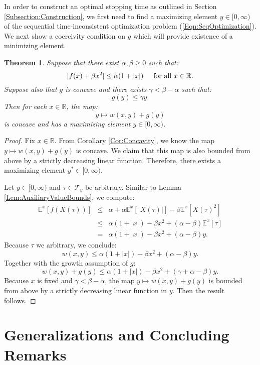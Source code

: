 \documentclass[11pt]{article}
\newtheorem{thm}{Theorem}
\begin{document}
In order to construct an optimal stopping time as outlined in Section \ref{Subsection:Construction}, we first need to find a maximizing element $y\in[0,\infty)$ of the sequential time-inconsistent optimization problem (\ref{Eqn:SeqOptimization}). We next show a coercivity condition on $g$ which will provide existence of a minimizing element.

\begin{thm}\label{Thm:MaximalElement}
Suppose that there exist $\alpha,\beta\geq 0$ such that:
\[|f(x)+\beta x^2|\leq\alpha(1+|x|)\hspace{0.5cm}\text{for all }x\in\mathbb{R}.\]
Suppose also that $g$ is concave and there exists $\gamma <\beta-\alpha$ such that:
\[g(y)\leq\gamma y.\]
Then for each $x\in\mathbb{R}$, the map:
\[y\mapsto w(x,y)+g(y)\]
is concave and has a maximizing element $y\in[0,\infty)$.\end{thm}
\begin{proof}
Fix $x\in\mathbb{R}$. From Corollary \ref{Cor:Concavity}, we know the map $y\mapsto w(x,y)+g(y)$ is concave. We claim that this map is also bounded from above by a strictly decreasing linear function. Therefore, there exists a maximizing element $y^*\in[0,\infty)$.

Let $y\in[0,\infty)$ and $\tau\in\mathcal{T}_y$ be arbitrary. Similar to Lemma \ref{Lem:AuxiliaryValueBounds}, we compute:
\begin{eqnarray}
\mathbb{E}^x\left[f(X(\tau))\right] & \leq & \alpha + \alpha\mathbb{E}^x\left[|X(\tau)|\right]-\beta\mathbb{E}^x\left[X(\tau)^2\right]\nonumber\\
& \leq & \alpha(1+|x|)-\beta x^2+(\alpha-\beta)\mathbb{E}^x\left[\tau\right]\nonumber\\
& = & \alpha(1+|x|)-\beta x^2+(\alpha-\beta)y.
\end{eqnarray}
Because $\tau$ we arbitrary, we conclude:
\[w(x,y)\leq\alpha(1+|x|)-\beta x^2+(\alpha-\beta)y.\]
Together with the growth assumption of $g$:
\[w(x,y)+g(y)\leq\alpha(1+|x|)-\beta x^2+(\gamma+\alpha-\beta)y.\]
Because $x$ is fixed and $\gamma<\beta-\alpha$, the map $y\mapsto w(x,y)+g(y)$ is bounded from above by a strictly decreasing linear function in $y$. Then the result follows.
\end{proof}

\section{Generalizations and Concluding Remarks}\label{Section:Generalization}
\end{document}
